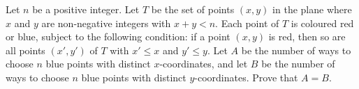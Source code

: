 Let $n$ be a positive integer.
Let $T$ be the set of points $(x,y)$ in the plane
where $x$ and $y$ are non-negative integers with $x+y<n$.
Each point of $T$ is coloured red or blue,
subject to the following condition:
if a point $(x,y)$ is red,
then so are all points $(x',y')$ of $T$
with $x'\leq x$ and $y'\leq y$.
Let $A$ be the number of ways to choose $n$ blue points
with distinct $x$-coordinates,
and let $B$ be the number of ways to choose $n$ blue
points with distinct $y$-coordinates.
Prove that $A=B$.